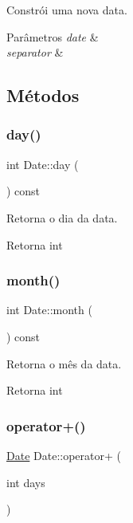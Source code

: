 Constrói uma nova data. 


\begin{DoxyParams}{Parâmetros}
{\em date} & \\
\hline
{\em separator} & \\
\hline
\end{DoxyParams}


\subsection{Métodos}
\mbox{\label{classDate_a42aff770b2b450b6b2d83789b9194d56}} 
\subsubsection{\texorpdfstring{day()}{day()}}
{\footnotesize\ttfamily int Date\+::day (\begin{DoxyParamCaption}{ }\end{DoxyParamCaption}) const}



Retorna o dia da data. 

\begin{DoxyReturn}{Retorna}
int 
\end{DoxyReturn}
\mbox{\label{classDate_a82f550e37c8ff6a3709a256b2e43b762}} 
\subsubsection{\texorpdfstring{month()}{month()}}
{\footnotesize\ttfamily int Date\+::month (\begin{DoxyParamCaption}{ }\end{DoxyParamCaption}) const}



Retorna o mês da data. 

\begin{DoxyReturn}{Retorna}
int 
\end{DoxyReturn}
\mbox{\label{classDate_a859a8d7af8cdbee73089732f59ab7492}} 
\subsubsection{\texorpdfstring{operator+()}{operator+()}}
{\footnotesize\ttfamily \hyperlink{classDate}{Date} Date\+::operator+ (\begin{DoxyParamCaption}\item[{int}]{days }\end{DoxyParamCaption})}



